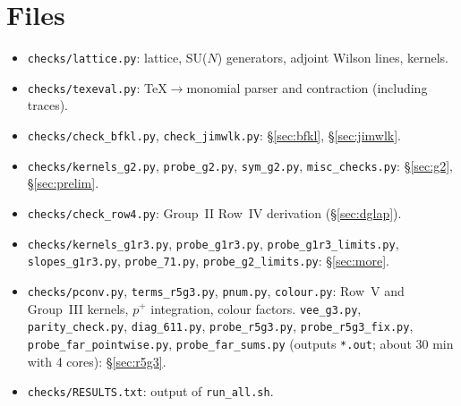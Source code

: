 \documentclass[10pt]{article}
\begin{document}
\section{Files}\sloppy
\begin{itemize}
\item \texttt{checks/lattice.py}: lattice, SU($N$) generators, adjoint Wilson lines, kernels.
\item \texttt{checks/texeval.py}: TeX$\to$monomial parser and contraction (including traces).
\item \texttt{checks/check\_bfkl.py}, \texttt{check\_jimwlk.py}: \S\ref{sec:bfkl}, \S\ref{sec:jimwlk}.
\item \texttt{checks/kernels\_g2.py}, \texttt{probe\_g2.py}, \texttt{sym\_g2.py}, \texttt{misc\_checks.py}: \S\ref{sec:g2}, \S\ref{sec:prelim}.
\item \texttt{checks/check\_row4.py}: Group~II Row~IV derivation (\S\ref{sec:dglap}).
\item \texttt{checks/kernels\_g1r3.py}, \texttt{probe\_g1r3.py}, \texttt{probe\_g1r3\_limits.py}, \texttt{slopes\_g1r3.py}, \texttt{probe\_71.py}, \texttt{probe\_g2\_limits.py}: \S\ref{sec:more}.
\item \texttt{checks/pconv.py}, \texttt{terms\_r5g3.py}, \texttt{pnum.py}, \texttt{colour.py}: Row~V and Group~III kernels, $p^+$ integration, colour factors. \texttt{vee\_g3.py}, \texttt{parity\_check.py}, \texttt{diag\_611.py}, \texttt{probe\_r5g3.py}, \texttt{probe\_r5g3\_fix.py}, \texttt{probe\_far\_pointwise.py}, \texttt{probe\_far\_sums.py} (outputs \texttt{*.out}; about 30 min with 4 cores): \S\ref{sec:r5g3}.
\item \texttt{checks/RESULTS.txt}: output of \texttt{run\_all.sh}.
\end{itemize}
\end{document}
